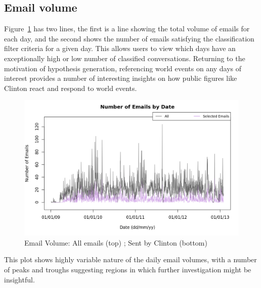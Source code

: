 \documentclass[journal]{vgtc}                %
\begin{document}
\subsection{Email volume}
\label{sect:Displays:volume}
Figure~\ref{fig:VolumeAll} has two lines, the first is a line showing the total volume of emails for each day, and the second shows the number of emails satisfying the classification filter criteria for a given day. This allows users to view which days have an exceptionally high or low number of classified conversations. Returning to the motivation of hypothesis generation, referencing world events on any days of interest provides a number of interesting insights on how public figures like Clinton react and respond to world events.

\begin{figure}[h]
\begin{center}
\includegraphics[width=0.95\linewidth]{VolumeFullTime}
\caption{Email Volume: All emails (top) ; Sent by Clinton (bottom)}
\label{fig:VolumeAll}
\end{center}
\end{figure}

This plot shows highly variable nature of the daily email volumes, with a number of peaks and troughs suggesting regions in which further investigation might be insightful.
\end{document}

